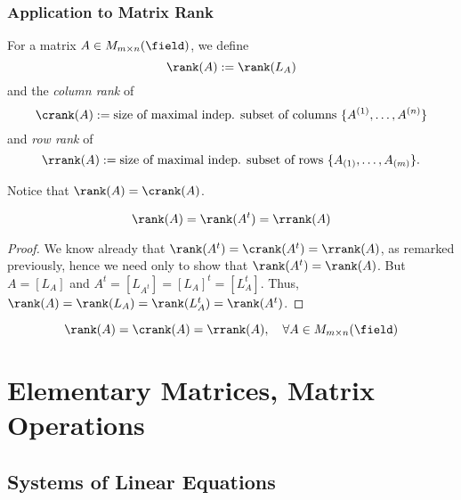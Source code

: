 \subsubsection{Application to Matrix Rank}

\begin{definition}
    For a matrix $A \in M_{m\times n} (\field)$, we define \[
    \rank(A) := \rank(L_A)    
    \]
    and the \emph{column rank} of \[
    \crank(A) := \text{size of maximal indep. subset of columns } \{A^{(1)}, \dots, A^{(n)}\}
    \]
    and \emph{row rank} of \[
    \rrank(A) := \text{size of maximal indep. subset of rows } \{A_{(1)}, \dots, A_{(m)}\}.
    \]
\end{definition}

\begin{remark}
    Notice that $\rank(A) = \crank(A)$.
\end{remark}

\begin{corollary}
    \[
    \rank(A) = \rank(A^t) = \rrank(A)
    \]
\end{corollary}

\begin{proof}
    We know already that $\rank(A^t) = \crank(A^t) = \rrank(A)$, as remarked previously, hence we need only to show that $\rank(A^t) = \rank(A)$. But $A = [L_A]$ and $A^t = [L_{A^t}] = [L_A]^t = [L_A^t]$. Thus, $\rank(A) = \rank(L_A) = \rank(L_A^t) = \rank(A^t)$.
\end{proof}

\begin{corollary}
    $$\rank(A) = \crank(A) = \rrank(A), \quad \forall A \in M_{m \times n}(\field)$$
\end{corollary}

\section{Elementary Matrices, Matrix Operations}
\subsection{Systems of Linear Equations}

